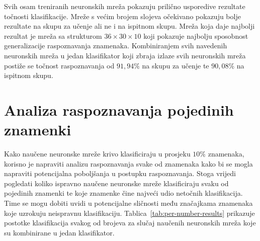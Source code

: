 Svih osam treniranih neuronskih mreža pokazuju prilično usporedive rezultate točnosti klasifikacije. Mreže s većim
brojem slojeva očekivano pokazuju bolje rezultate na skupu za učenje ali ne i na ispitnom skupu. Mreža koja daje
najbolji rezultat je mreža sa strukturom $36 \times 30 \times 10$ koji pokazuje najbolju sposobnost generalizacije
raspoznavanja znamenaka. Kombiniranjem svih navedenih neuronskih mreža u jedan klasifikator koji zbraja izlaze svih
neuronskih mreža postiže se točnost raspoznavanja od $91,94\%$ na skupu za učenje te $90,08\%$ na ispitnom skupu.


\section{Analiza raspoznavanja pojedinih znamenki}
Kako naučene neuronske mreže krivo klasificiraju u prosjeku $10\%$ znamenaka, korisno je napraviti analizu raspoznavanja
svake od znamenaka kako bi se mogla napraviti potencijalna poboljšanja u postupku raspoznavanja. Stoga vrijedi
pogledati koliko ispravno naučene neuronske mreže klasificiraju svaku od pojedinih znamenki te koje znamenke čine
najveći udio netočnih klasifikacija. Time se mogu dobiti uvidi u potencijalne sličnosti među značajkama znamenaka koje
uzrokuju neispravnu klasifikaciju. Tablica\ \ref{tab:per-number-results} prikazuje postotke klasifikacija svakog od
brojeva za slučaj naučenih neuronskih mreža koje su kombinirane u jedan klasifikator.
